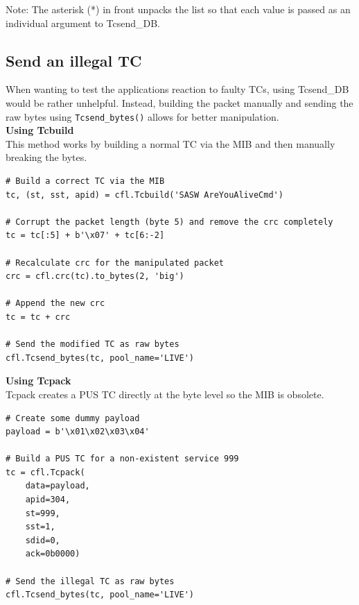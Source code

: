 Note: The asterisk (*) in front unpacks the list so that each value is passed as an individual argument to Tcsend\_DB.



\subsection{Send an illegal TC}
When wanting to test the applications reaction to faulty TCs, using Tcsend\_DB would be rather unhelpful. Instead, building the packet manually and sending the raw bytes using \texttt{Tcsend\_bytes()} allows for better manipulation. \\


\textbf{Using Tcbuild}\\
This method works by building a normal TC via the MIB and then manually breaking the bytes.

\begin{verbatim}
# Build a correct TC via the MIB
tc, (st, sst, apid) = cfl.Tcbuild('SASW AreYouAliveCmd')

# Corrupt the packet length (byte 5) and remove the crc completely
tc = tc[:5] + b'\x07' + tc[6:-2]

# Recalculate crc for the manipulated packet
crc = cfl.crc(tc).to_bytes(2, 'big')

# Append the new crc
tc = tc + crc

# Send the modified TC as raw bytes
cfl.Tcsend_bytes(tc, pool_name='LIVE')

\end{verbatim}

\textbf{Using Tcpack} \\
Tcpack creates a PUS TC directly at the byte level so the MIB is obsolete.

\begin{verbatim}
# Create some dummy payload
payload = b'\x01\x02\x03\x04'

# Build a PUS TC for a non-existent service 999
tc = cfl.Tcpack(
    data=payload,
    apid=304,
    st=999,
    sst=1,
    sdid=0,
    ack=0b0000)

# Send the illegal TC as raw bytes
cfl.Tcsend_bytes(tc, pool_name='LIVE')

\end{verbatim}



